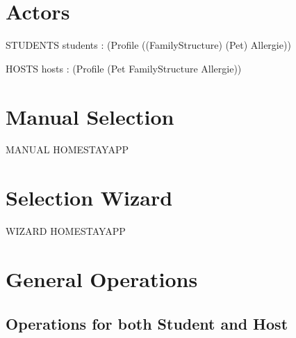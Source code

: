 \documentclass[11pt]{article}
\begin{document}
\section*{Actors}
\begin{schema}{STUDENTS}
	students : \power (Profile \rightarrow ((\nat \rightarrow FamilyStructure) \cross \power (\nat \rightarrow Pet) \cross \power Allergie))  \\
\where
\end{schema}

\begin{schema}{HOSTS}
	hosts : \power (Profile \rightarrow (\power Pet \cross \power FamilyStructure \cross \power Allergie))
	\where

\end{schema}


\section*{Manual Selection}

\begin{schema}{MANUAL}
	\Xi HOMESTAYAPP\\
\end{schema}

\section*{Selection Wizard}

\begin{schema}{WIZARD}
	\Xi HOMESTAYAPP\\
\end{schema}


\section*{General Operations}

\subsection*{Operations for both Student and Host}
\end{document}
